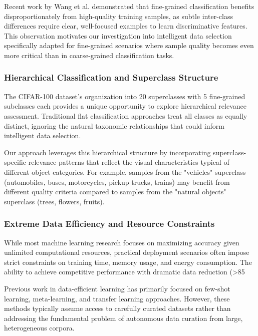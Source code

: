 \documentclass[12pt]{article}
\begin{document}
Recent work by Wang et al. demonstrated that fine-grained classification benefits disproportionately from high-quality training samples, as subtle inter-class differences require clear, well-focused examples to learn discriminative features. This observation motivates our investigation into intelligent data selection specifically adapted for fine-grained scenarios where sample quality becomes even more critical than in coarse-grained classification tasks.

\subsubsection{Hierarchical Classification and Superclass Structure}\label{hierarchical-classification}

The CIFAR-100 dataset's organization into 20 superclasses with 5 fine-grained subclasses each provides a unique opportunity to explore hierarchical relevance assessment. Traditional flat classification approaches treat all classes as equally distinct, ignoring the natural taxonomic relationships that could inform intelligent data selection.

Our approach leverages this hierarchical structure by incorporating superclass-specific relevance patterns that reflect the visual characteristics typical of different object categories. For example, samples from the "vehicles" superclass (automobiles, buses, motorcycles, pickup trucks, trains) may benefit from different quality criteria compared to samples from the "natural objects" superclass (trees, flowers, fruits).

\subsubsection{Extreme Data Efficiency and Resource Constraints}\label{extreme-efficiency}

While most machine learning research focuses on maximizing accuracy given unlimited computational resources, practical deployment scenarios often impose strict constraints on training time, memory usage, and energy consumption. The ability to achieve competitive performance with dramatic data reduction (>85%

Previous work in data-efficient learning has primarily focused on few-shot learning, meta-learning, and transfer learning approaches. However, these methods typically assume access to carefully curated datasets rather than addressing the fundamental problem of autonomous data curation from large, heterogeneous corpora.
\end{document}
